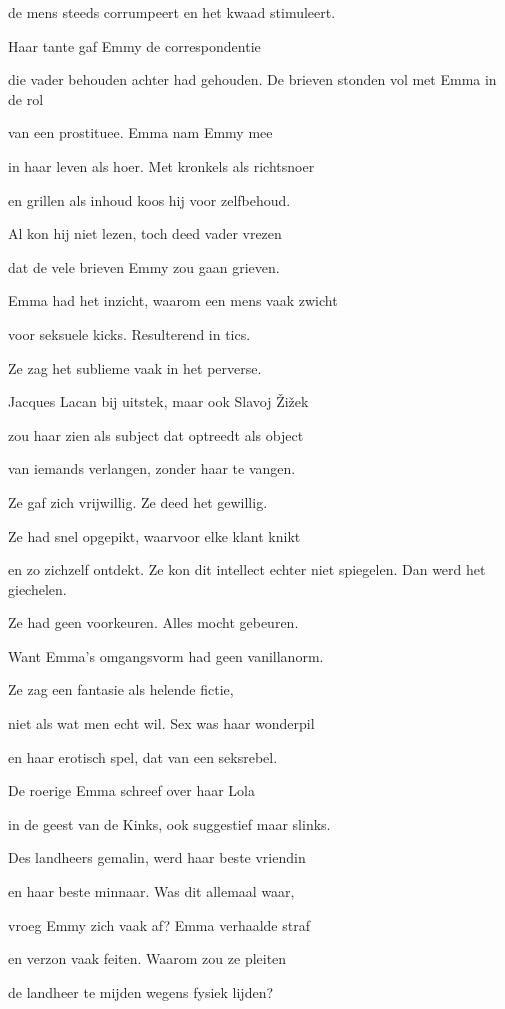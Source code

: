 de mens steeds corrumpeert
en het kwaad stimuleert.

Haar tante gaf Emmy
de correspondentie

die vader behouden
achter had gehouden.
De brieven stonden vol
met Emma in de rol

van een prostituee.
Emma nam Emmy mee

in haar leven als hoer.
Met kronkels als richtsnoer

en grillen als inhoud
koos hij voor zelfbehoud.

Al kon hij niet lezen,
toch deed vader vrezen

dat de vele brieven
Emmy zou gaan grieven.

Emma had het inzicht,
waarom een mens vaak zwicht

voor seksuele kicks.
Resulterend in tics.

Ze zag het sublieme
vaak in het perverse.

Jacques Lacan bij uitstek,
maar ook Slavoj Žižek

zou haar zien als subject
dat optreedt als object

van iemands verlangen,
zonder haar te vangen.

Ze gaf zich vrijwillig.
Ze deed het gewillig.

Ze had snel opgepikt,
waarvoor elke klant knikt

en zo zichzelf ontdekt.
Ze kon dit intellect
echter niet spiegelen.
Dan werd het giechelen.

Ze had geen voorkeuren.
Alles mocht gebeuren.

Want Emma’s omgangsvorm
had geen vanillanorm.

Ze zag een fantasie
als helende fictie,

niet als wat men echt wil.
Sex was haar wonderpil

en haar erotisch spel,
dat van een seksrebel.

De roerige Emma
schreef over haar Lola

in de geest van de Kinks,
ook suggestief maar slinks.

Des landheers gemalin,
werd haar beste vriendin

en haar beste minnaar.
Was dit allemaal waar,

vroeg Emmy zich vaak af?
Emma verhaalde straf

en verzon vaak feiten.
Waarom zou ze pleiten

de landheer te mijden
wegens fysiek lijden?

